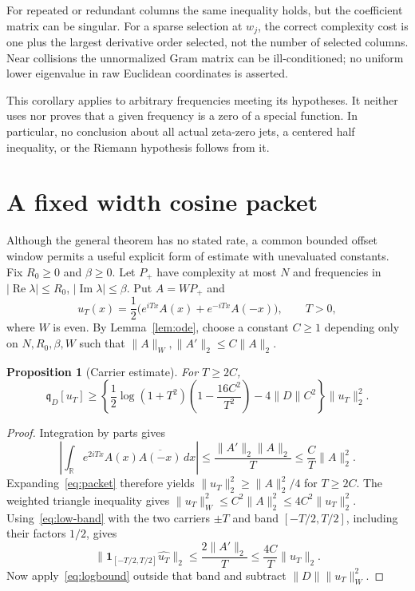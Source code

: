 \documentclass[11pt]{article}
\newtheorem{proposition}[theorem]{Proposition}
\theoremstyle{definition}
\theoremstyle{remark}
\newcommand{\R}{\mathbb R}
\newcommand{\qD}{\mathfrak q_D}
\newcommand{\norm}[1]{\lVert #1\rVert}
\newcommand{\dd}{\,dx}
\DeclareMathOperator{\Rea}{Re}
\DeclareMathOperator{\Ima}{Im}
\begin{document}
For repeated or redundant columns the same inequality holds, but the
coefficient matrix can be singular. For a sparse selection at $w_j$, the
correct complexity cost is one plus the largest derivative order selected,
not the number of selected columns. Near collisions the unnormalized Gram
matrix can be ill-conditioned; no uniform lower eigenvalue in raw
Euclidean coordinates is asserted.

This corollary applies to arbitrary frequencies meeting its hypotheses.
It neither uses nor proves that a given frequency is a zero of a special
function. In particular, no conclusion about all actual zeta-zero jets,
a centered half inequality, or the Riemann hypothesis follows from it.

\section{A fixed width cosine packet}\label{sec:packet}

Although the general theorem has no stated rate, a common bounded offset
window permits a useful explicit form of estimate with unevaluated
constants. Fix $R_0\ge0$ and $\beta\ge0$. Let $P_+$ have complexity at most $N$ and frequencies in
$|\Rea\lambda|\le R_0$, $|\Ima\lambda|\le\beta$. Put $A=WP_+$ and
\begin{equation}\label{eq:packet}
 u_T(x)=\frac12\bigl(e^{iTx}A(x)+e^{-iTx}A(-x)\bigr),\qquad T>0,
\end{equation}
where $W$ is even. By Lemma~\ref{lem:ode}, choose a constant $C\ge1$
depending only on $N,R_0,\beta,W$ such that
$\norm A_W,\norm{A'}_2\le C\norm A_2$.

\begin{proposition}[Carrier estimate]\label{prop:packet}
For $T\ge2C$,
\begin{equation}\label{eq:packet-bound}
 \qD[u_T]\ge\left\{
 \frac12\log(1+T^2)\left(1-\frac{16C^2}{T^2}\right)
 -4\norm D C^2\right\}\norm{u_T}_2^2.
\end{equation}
\end{proposition}
\begin{proof}
Integration by parts gives
\[
 \left|\int_\R e^{2iTx}A(x)\overline{A(-x)}\dd\right|
 \le\frac{\norm{A'}_2\norm A_2}{T}
 \le\frac C T\norm A_2^2.
\]
Expanding~\eqref{eq:packet} therefore yields
$\norm{u_T}_2^2\ge\norm A_2^2/4$ for $T\ge2C$.
The weighted triangle inequality gives
$\norm{u_T}_W^2\le C^2\norm A_2^2\le4C^2\norm{u_T}_2^2$.
Using~\eqref{eq:low-band} with the two carriers $\pm T$ and band
$[-T/2,T/2]$, including their factors $1/2$, gives
\[
 \norm{\mathbf1_{[-T/2,T/2]}\widehat{u_T}}_2
 \le\frac{2\norm{A'}_2}{T}
 \le\frac{4C}{T}\norm{u_T}_2.
\]
Now apply~\eqref{eq:logbound} outside that band and subtract
$\norm D\norm{u_T}_W^2$.
\end{proof}
\end{document}
